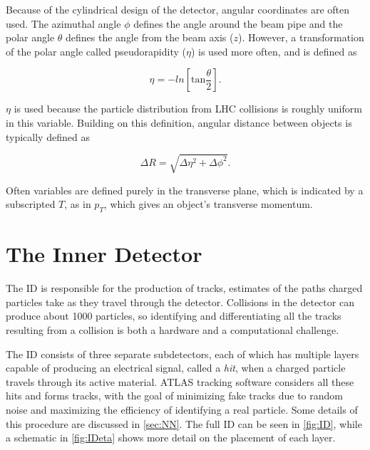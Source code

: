 Because of the cylindrical design of the detector, angular coordinates are often used. The azimuthal angle $\phi$ defines the angle around the beam pipe and the polar angle $\theta$ defines the angle from the beam axis ($z$). However, a transformation of the polar angle called pseudorapidity ($\eta$) is used more often, and is defined as 

\begin{equation}
\eta = - ln [ \mathrm{tan} \frac{\theta}{2} ]. 
\end{equation}

$\eta$ is used because the particle distribution from \ac{LHC} collisions is roughly uniform in this variable. Building on this definition, angular distance between objects is typically defined as

\begin{equation}
\Delta R = \sqrt{\Delta\eta^2 + \Delta\phi^2}. 
\end{equation}

Often variables are defined purely in the transverse plane, which is indicated by a subscripted $T$, as in $p_T$, which gives an object's transverse momentum. 


\section{The Inner Detector}
\label{sec:ID}

The \acf{ID} is responsible for the production of tracks, estimates of the paths charged particles take as they travel through the detector. Collisions in the detector can produce about 1000 particles, so identifying and differentiating all the tracks resulting from a collision is both a hardware and a computational challenge. 

The \ac{ID} consists of three separate subdetectors, each of which has multiple layers capable of producing an electrical signal, called a \textit{hit}, when a charged particle travels through its active material. ATLAS tracking software considers all these hits and forms tracks, with the goal of minimizing fake tracks due to random noise and maximizing the efficiency of identifying a real particle. Some details of this procedure are discussed in \autoref{sec:NN}. The full \ac{ID} can be seen in \autoref{fig:ID}, while a schematic in \autoref{fig:IDeta} shows more detail on the placement of each layer.

